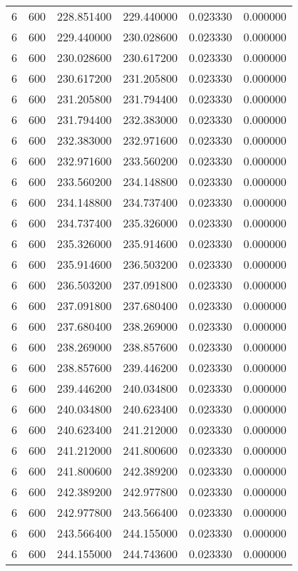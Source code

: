 \begin{longtable}{rrrrrr}
6 & 600 & 228.851400 & 229.440000 & 0.023330 & 0.000000 \\
6 & 600 & 229.440000 & 230.028600 & 0.023330 & 0.000000 \\
6 & 600 & 230.028600 & 230.617200 & 0.023330 & 0.000000 \\
6 & 600 & 230.617200 & 231.205800 & 0.023330 & 0.000000 \\
6 & 600 & 231.205800 & 231.794400 & 0.023330 & 0.000000 \\
6 & 600 & 231.794400 & 232.383000 & 0.023330 & 0.000000 \\
6 & 600 & 232.383000 & 232.971600 & 0.023330 & 0.000000 \\
6 & 600 & 232.971600 & 233.560200 & 0.023330 & 0.000000 \\
6 & 600 & 233.560200 & 234.148800 & 0.023330 & 0.000000 \\
6 & 600 & 234.148800 & 234.737400 & 0.023330 & 0.000000 \\
6 & 600 & 234.737400 & 235.326000 & 0.023330 & 0.000000 \\
6 & 600 & 235.326000 & 235.914600 & 0.023330 & 0.000000 \\
6 & 600 & 235.914600 & 236.503200 & 0.023330 & 0.000000 \\
6 & 600 & 236.503200 & 237.091800 & 0.023330 & 0.000000 \\
6 & 600 & 237.091800 & 237.680400 & 0.023330 & 0.000000 \\
6 & 600 & 237.680400 & 238.269000 & 0.023330 & 0.000000 \\
6 & 600 & 238.269000 & 238.857600 & 0.023330 & 0.000000 \\
6 & 600 & 238.857600 & 239.446200 & 0.023330 & 0.000000 \\
6 & 600 & 239.446200 & 240.034800 & 0.023330 & 0.000000 \\
6 & 600 & 240.034800 & 240.623400 & 0.023330 & 0.000000 \\
6 & 600 & 240.623400 & 241.212000 & 0.023330 & 0.000000 \\
6 & 600 & 241.212000 & 241.800600 & 0.023330 & 0.000000 \\
6 & 600 & 241.800600 & 242.389200 & 0.023330 & 0.000000 \\
6 & 600 & 242.389200 & 242.977800 & 0.023330 & 0.000000 \\
6 & 600 & 242.977800 & 243.566400 & 0.023330 & 0.000000 \\
6 & 600 & 243.566400 & 244.155000 & 0.023330 & 0.000000 \\
6 & 600 & 244.155000 & 244.743600 & 0.023330 & 0.000000 \\

\end{longtable}
